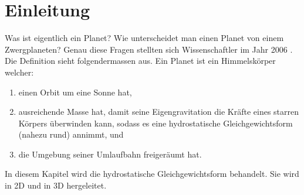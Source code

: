 %
%
%
%
\section{Einleitung\label{planet:section:einleitung}}
Was ist eigentlich ein Planet?
Wie unterscheidet man einen Planet von einem Zwergplaneten?
Genau diese Fragen stellten sich Wissenschaftler im Jahr 2006 \cite{planet:iaub5}.
Die Definition sieht folgendermassen aus.
Ein Planet ist ein Himmelskörper welcher:
\begin{enumerate}
	\item einen Orbit um eine Sonne hat,
	\item ausreichende Masse hat, damit seine Eigengravitation die Kräfte eines starren Körpers überwinden kann, sodass es eine hydrostatische Gleichgewichtsform (nahezu rund) annimmt, und
	\item die Umgebung seiner Umlaufbahn freigeräumt hat.
\end{enumerate}

\noindent
In diesem Kapitel wird die hydrostatische Gleichgewichtsform behandelt.
Sie wird in 2D und in 3D hergeleitet.


